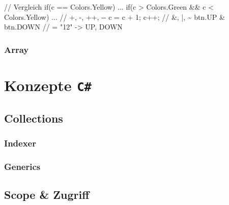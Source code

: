 \documentclass[
  9pt,
  a4paperpaper,
  DIV=11]{scrartcl}
\newenvironment{Shaded}{}{}
\newcommand{\CommentTok}[1]{\textcolor[rgb]{0.42,0.45,0.49}{#1}}
\newcommand{\DecValTok}[1]{\textcolor[rgb]{0.00,0.36,0.77}{#1}}
\newcommand{\FunctionTok}[1]{\textcolor[rgb]{0.44,0.26,0.76}{#1}}
\newcommand{\KeywordTok}[1]{\textcolor[rgb]{0.84,0.23,0.29}{#1}}
\newcommand{\NormalTok}[1]{\textcolor[rgb]{0.14,0.16,0.18}{#1}}
\newcommand{\OperatorTok}[1]{\textcolor[rgb]{0.14,0.16,0.18}{#1}}
\numberwithin{equation}{section}
\begin{document}
\begin{multicols}{2}
\begin{Shaded}
\begin{Highlighting}[]
\CommentTok{// Vergleich}
  \KeywordTok{if}\OperatorTok{(}\NormalTok{c }\OperatorTok{==}\NormalTok{ Colors}\OperatorTok{.}\FunctionTok{Yellow}\OperatorTok{)} \OperatorTok{...}                    
  \KeywordTok{if}\OperatorTok{(}\NormalTok{c }\OperatorTok{\textgreater{}}\NormalTok{ Colors}\OperatorTok{.}\FunctionTok{Green} \OperatorTok{\&\&}\NormalTok{ c }\OperatorTok{\textless{}}\NormalTok{ Colors}\OperatorTok{.}\FunctionTok{Yellow}\OperatorTok{)} \OperatorTok{...}
\CommentTok{// +, {-}, ++, {-}{-}}
\NormalTok{  c }\OperatorTok{=}\NormalTok{ c }\OperatorTok{+} \DecValTok{1}\OperatorTok{;}\NormalTok{    c}\OperatorTok{++;}                                
\CommentTok{// \&, |, \textasciitilde{}}
\NormalTok{  btn}\OperatorTok{.}\FunctionTok{UP} \OperatorTok{\&}\NormalTok{ btn}\OperatorTok{.}\FunctionTok{DOWN}  \CommentTok{// = "12" {-}\textgreater{} UP, DOWN      }
\end{Highlighting}
\end{Shaded}

\hypertarget{array}{%
\subsubsection{Array}\label{array}}

\hypertarget{konzepte-c}{%
\section{\texorpdfstring{Konzepte
\texttt{C\#}}{Konzepte C\#}}\label{konzepte-c}}

\hypertarget{collections}{%
\subsection{Collections}\label{collections}}

\hypertarget{indexer}{%
\subsubsection{Indexer}\label{indexer}}

\hypertarget{generics}{%
\subsubsection{Generics}\label{generics}}

\hypertarget{scope-zugriff}{%
\subsection{Scope \& Zugriff}\label{scope-zugriff}}


\end{multicols}
\end{document}
